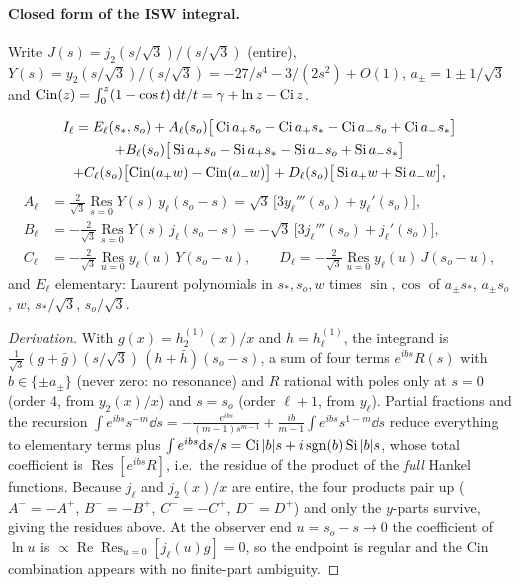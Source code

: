 \paragraph{Closed form of the ISW integral.}  Write $J(s)=j_2(s/\sqrt3)/(s/\sqrt3)$ (entire),
$Y(s)=y_2(s/\sqrt3)/(s/\sqrt3)=-27/s^4-3/(2s^2)+O(1)$, $a_\pm=1\pm1/\sqrt3$ and
$\mathrm{Cin}(z)=\int_0^z(1-\cos t)\,\mathrm d t/t=\gamma+\ln z-\operatorname{Ci} z$.
\begin{theorem}\label{thm:isw}
\begin{multline}
I_\ell=E_\ell(s_*,s_o)+A_\ell(s_o)\big[\operatorname{Ci} a_+s_o-\operatorname{Ci} a_+s_*-\operatorname{Ci} a_-s_o+\operatorname{Ci} a_-s_*\big]\\
+B_\ell(s_o)\big[\operatorname{Si} a_+s_o-\operatorname{Si} a_+s_*-\operatorname{Si} a_-s_o+\operatorname{Si} a_-s_*\big]\\
+C_\ell(s_o)\big[\mathrm{Cin}(a_+w)-\mathrm{Cin}(a_-w)\big]+D_\ell(s_o)\big[\operatorname{Si} a_+w+\operatorname{Si} a_-w\big],
\end{multline}
\begin{align}
A_\ell&=\tfrac{2}{\sqrt3}\operatorname*{Res}_{s=0}Y(s)\,y_\ell(s_o-s)=\sqrt3\,\big[3y_\ell'''(s_o)+y_\ell'(s_o)\big],\nonumber\\
B_\ell&=-\tfrac{2}{\sqrt3}\operatorname*{Res}_{s=0}Y(s)\,j_\ell(s_o-s)=-\sqrt3\,\big[3j_\ell'''(s_o)+j_\ell'(s_o)\big],\\
C_\ell&=-\tfrac{2}{\sqrt3}\operatorname*{Res}_{u=0}y_\ell(u)\,Y(s_o-u),\qquad
D_\ell=-\tfrac{2}{\sqrt3}\operatorname*{Res}_{u=0}y_\ell(u)\,J(s_o-u),\nonumber
\end{align}
and $E_\ell$ elementary: Laurent polynomials in $s_*,s_o,w$ times $\sin,\cos$ of $a_\pm s_*$, $a_\pm s_o$, $w$, $s_*/\sqrt3$, $s_o/\sqrt3$.
\end{theorem}
\begin{proof}[Derivation]
With $g(x)=h^{(1)}_2(x)/x$ and $h=h^{(1)}_\ell$, the integrand is $\frac1{\sqrt3}(g+\bar g)(s/\sqrt3)\,(h+\bar h)(s_o-s)$, a sum of four
terms $e^{ibs}R(s)$ with $b\in\{\pm a_\pm\}$ (never zero: no resonance) and $R$ rational with poles only at $s=0$ (order 4, from
$y_2(x)/x$) and $s=s_o$ (order $\ell+1$, from $y_\ell$).  Partial fractions and the recursion
$\int e^{ibs}s^{-m}\dd s=-\frac{e^{ibs}}{(m-1)s^{m-1}}+\frac{ib}{m-1}\int e^{ibs}s^{1-m}\dd s$ reduce everything to elementary terms plus
$\int e^{ibs}\mathrm d s/s=\operatorname{Ci}|b|s+i\,\mathrm{sgn}(b)\operatorname{Si}|b|s$, whose total coefficient is $\operatorname{Res}[e^{ibs}R]$, i.e.\ the residue of the
product of the \emph{full} Hankel functions.  Because $j_\ell$ and $j_2(x)/x$ are entire, the four products pair up
($A^-=-A^+$, $B^-=-B^+$, $C^-=-C^+$, $D^-=D^+$) and only the $y$-parts survive, giving the residues above.  At the observer end
$u=s_o-s\to0$ the coefficient of $\ln u$ is $\propto\operatorname{Re}\operatorname{Res}_{u=0}[j_\ell(u)g]=0$, so the endpoint is regular and
the $\mathrm{Cin}$ combination appears with no finite-part ambiguity.
\end{proof}
